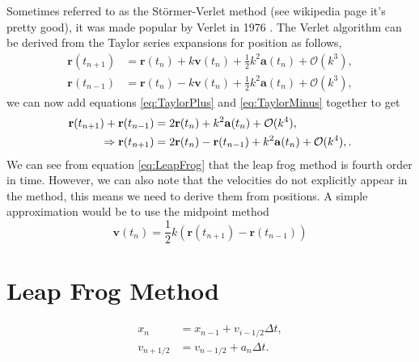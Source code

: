 Sometimes referred to as the St\"ormer-Verlet method (see wikipedia page it's pretty good), it was made popular by Verlet in 1976 \cite{Verlet1967}. The Verlet algorithm can be derived from the Taylor series expansions for position as follows,
\begin{subequations}
\begin{align}
    \mathbf{r}(t_{n+1}) &= \mathbf{r}(t_{n}) + k \mathbf{v}( t_{n} ) + \frac{1}{2}k^2\mathbf{a}(t_{n}) + {\mathcal O}(k^3), \label{eq:TaylorPlus}\\
    \mathbf{r}(t_{n-1}) &= \mathbf{r}(t_{n}) - k \mathbf{v}( t_{n} ) + \frac{1}{2}k^2\mathbf{a}(t_{n}) + {\mathcal O}(k^3),\label{eq:TaylorMinus}
\end{align}
\end{subequations}
we can now add equations \eqref{eq:TaylorPlus} and \eqref{eq:TaylorMinus} together to get
\begin{align}
    \mathbf{r}(t_{n+1}) + \mathbf{r}(t_{n-1}) &= 2\mathbf{r}(t_{n}) + k^2\mathbf{a}(t_{n}) + {\mathcal O}(k^4),\notag\\
    \Rightarrow \mathbf{r}(t_{n+1}) &= 2\mathbf{r}(t_{n}) - \mathbf{r}(t_{n-1}) + k^2\mathbf{a}(t_{n}) + {\mathcal O}(k^4),\label{eq:LeapFrog}.
\end{align}
We can see from equation \eqref{eq:LeapFrog} that the leap frog method is fourth order in time. However, we can also note that the velocities do not explicitly appear in the method, this means we need to derive them from positions. A simple approximation would be to use the midpoint method
\begin{equation}
    \mathbf{v}(t_{n}) = \frac{1}{2}k\left(\mathbf{r}(t_{n+1}) - \mathbf{r}(t_{n-1})\right)
\end{equation}



\section{ Leap Frog Method }

\cite{Hockney1970}

\begin{align}
    x_{n} &= x_{n-1} + v_{i-1/2} \Delta t,\\
    v_{n+1/2} &= v_{n-1/2} + a_{n} \Delta t.
\end{align}


